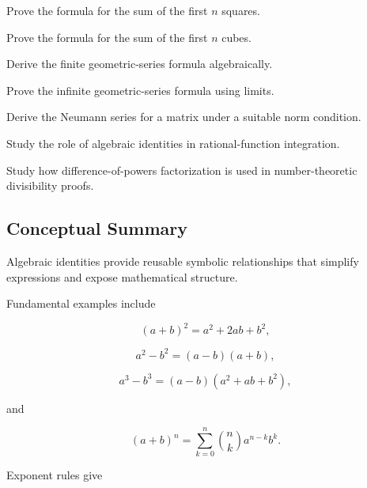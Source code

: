 \begin{exercise}[4]
Prove the formula for the sum of the first \(n\) squares.
\end{exercise}

\begin{exercise}[4]
Prove the formula for the sum of the first \(n\) cubes.
\end{exercise}

\begin{exercise}[4]
Derive the finite geometric-series formula algebraically.
\end{exercise}

\begin{exercise}[4]
Prove the infinite geometric-series formula using limits.
\end{exercise}

\begin{exercise}[4]
Derive the Neumann series for a matrix under a suitable norm condition.
\end{exercise}

\begin{exercise}[4]
Study the role of algebraic identities in rational-function integration.
\end{exercise}

\begin{exercise}[4]
Study how difference-of-powers factorization is used in number-theoretic
divisibility proofs.
\end{exercise}

\subsection{Conceptual Summary}
\label{subsec:algebraic-identities-summary}

Algebraic identities provide reusable symbolic relationships that simplify
expressions and expose mathematical structure.

Fundamental examples include

\[
\boxed{
(a+b)^2
=
a^2+2ab+b^2,
}
\]

\[
\boxed{
a^2-b^2
=
(a-b)(a+b),
}
\]

\[
\boxed{
a^3-b^3
=
(a-b)(a^2+ab+b^2),
}
\]

and

\[
\boxed{
(a+b)^n
=
\sum_{k=0}^{n}
\binom{n}{k}
a^{n-k}b^k.
}
\]

Exponent rules give

